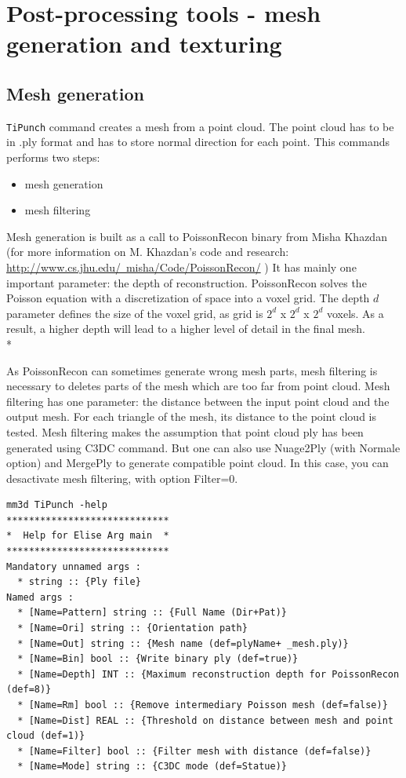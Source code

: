 
\section{Post-processing tools - mesh generation and texturing}

\subsection{Mesh generation}

{\tt TiPunch} command creates a mesh from a point cloud. The point cloud has to be in .ply format and has to store normal direction for each point.
This commands performs two steps:
\begin{itemize}
\item mesh generation
\item mesh filtering
\end{itemize}
Mesh generation is built as a call to PoissonRecon binary from Misha Khazdan (for more information on M. Khazdan's code and research: \href{http://www.cs.jhu.edu/~misha/Code/PoissonRecon/}{http://www.cs.jhu.edu/~misha/Code/PoissonRecon/} )
It has mainly one important parameter: the depth of reconstruction. PoissonRecon solves the Poisson equation with a discretization of space into a voxel grid. The depth $d$ parameter defines the size of the voxel grid, as grid is $2^d$ x $2^d$ x $2^d$ voxels.
As a result, a higher depth will lead to a higher level of detail in the final mesh.\\*

As PoissonRecon can sometimes generate wrong mesh parts, mesh filtering is necessary to deletes parts of the mesh which are too far from point cloud.
Mesh filtering has one parameter: the distance between the input point cloud and the output mesh. For each triangle of the mesh, its distance to the point cloud is tested.
Mesh filtering makes the assumption that point cloud ply has been generated using C3DC command. But one can also use Nuage2Ply (with Normale option) and MergePly to generate compatible point cloud. In this case, you can desactivate mesh filtering, with option Filter=0.

\begin{verbatim}
mm3d TiPunch -help
*****************************
*  Help for Elise Arg main  *
*****************************
Mandatory unnamed args :
  * string :: {Ply file}
Named args :
  * [Name=Pattern] string :: {Full Name (Dir+Pat)}
  * [Name=Ori] string :: {Orientation path}
  * [Name=Out] string :: {Mesh name (def=plyName+ _mesh.ply)}
  * [Name=Bin] bool :: {Write binary ply (def=true)}
  * [Name=Depth] INT :: {Maximum reconstruction depth for PoissonRecon (def=8)}
  * [Name=Rm] bool :: {Remove intermediary Poisson mesh (def=false)}
  * [Name=Dist] REAL :: {Threshold on distance between mesh and point cloud (def=1)}
  * [Name=Filter] bool :: {Filter mesh with distance (def=false)}
  * [Name=Mode] string :: {C3DC mode (def=Statue)}
\end{verbatim}

